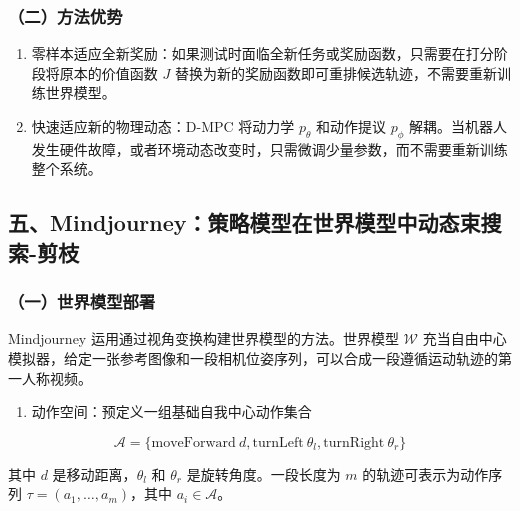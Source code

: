 \hypertarget{ux4e8cux65b9ux6cd5ux4f18ux52bf}{%
\subsubsection{（二）方法优势}\label{ux4e8cux65b9ux6cd5ux4f18ux52bf}}

\begin{enumerate}
\def\labelenumi{\arabic{enumi}.}
\tightlist
\item
  零样本适应全新奖励：如果测试时面临全新任务或奖励函数，只需要在打分阶段将原本的价值函数 \(J\) 替换为新的奖励函数即可重排候选轨迹，不需要重新训练世界模型。
\item
  快速适应新的物理动态：D-MPC 将动力学 \(p_\theta\) 和动作提议 \(p_\phi\) 解耦。当机器人发生硬件故障，或者环境动态改变时，只需微调少量参数，而不需要重新训练整个系统。
\end{enumerate}

\hypertarget{ux4e94mindjourneyux7b56ux7565ux6a21ux578bux5728ux4e16ux754cux6a21ux578bux4e2dux52a8ux6001ux675fux641cux7d22-ux526aux679d}{%
\subsection{五、Mindjourney：策略模型在世界模型中动态束搜索-剪枝}\label{ux4e94mindjourneyux7b56ux7565ux6a21ux578bux5728ux4e16ux754cux6a21ux578bux4e2dux52a8ux6001ux675fux641cux7d22-ux526aux679d}}

\hypertarget{ux4e00ux4e16ux754cux6a21ux578bux90e8ux7f72}{%
\subsubsection{（一）世界模型部署}\label{ux4e00ux4e16ux754cux6a21ux578bux90e8ux7f72}}

Mindjourney 运用通过视角变换构建世界模型的方法。世界模型 \(\mathcal{W}\) 充当自由中心模拟器，给定一张参考图像和一段相机位姿序列，可以合成一段遵循运动轨迹的第一人称视频。

\begin{enumerate}
\def\labelenumi{\arabic{enumi}.}
\tightlist
\item
  动作空间：预定义一组基础自我中心动作集合
\end{enumerate}

\[
\mathcal{A}
= \{
\mathrm{moveForward}\ d,
\mathrm{turnLeft}\ \theta_l,
\mathrm{turnRight}\ \theta_r
\}
\]

其中 \(d\) 是移动距离，\(\theta_l\) 和 \(\theta_r\) 是旋转角度。一段长度为 \(m\) 的轨迹可表示为动作序列 \(\tau = (a_1, \ldots, a_m)\)，其中 \(a_i \in \mathcal{A}\)。

